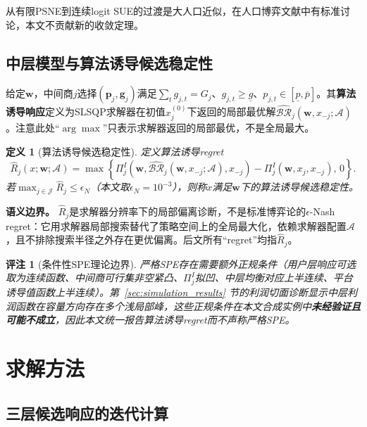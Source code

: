 \documentclass[UTF8,11pt]{ctexart}
\newtheorem{remark}{评注}
\newtheorem{definition}{定义}
\newcommand{\J}{\mathcal{J}}
\newcommand{\w}{\boldsymbol{w}}
\newcommand{\p}{\boldsymbol{p}}
\newcommand{\g}{\boldsymbol{g}}
\begin{document}
从有限PSNE到连续logit SUE的过渡是大人口近似，在人口博弈文献中有标准讨论\cite{sandholm2010population}，本文不贡献新的收敛定理。

\subsection{中层模型与算法诱导候选稳定性}
\label{sec:middle_intermediary}

给定$\w$，中间商$j$选择$(\p_j,\g_j)$满足$\sum_t g_{j,t}=G_j$、$g_{j,t}\ge\underline g$、$p_{j,t}\in[\underline p,\overline p]$。其\textbf{算法诱导响应}定义为SLSQP求解器在初值$x_j^{(0)}$下返回的局部最优解$\widehat{\mathcal{BR}}_j(\w,x_{-j};\mathcal{A})$。注意此处“$\arg\max$”只表示求解器返回的局部最优，不是全局最大。

\begin{definition}[算法诱导候选稳定性]
\label{def:solver_regret_candidate}
定义算法诱导regret
\begin{equation}
  \widehat R_j(x;\w;\mathcal{A})=
  \max\!\left\{
  \Pi^I_j(\w,\widehat{\mathcal{BR}}_j(\w,x_{-j};\mathcal{A}),x_{-j})
  -\Pi^I_j(\w,x_j,x_{-j}),\,0
  \right\}.
  \label{eq:solver_reported_regret}
\end{equation}
若$\max_{j\in\J}\widehat R_j\le\epsilon_N$（本文取$\epsilon_N=10^{-3}$），则称$x$满足$\w$下的算法诱导候选稳定性。
\end{definition}

\textbf{语义边界。} $\widehat R_j$是求解器分辨率下的局部偏离诊断，不是标准博弈论的$\epsilon$-Nash regret：它用求解器局部搜索替代了策略空间上的全局最大化，依赖求解器配置$\mathcal{A}$，且不排除搜索半径之外存在更优偏离。后文所有“regret”均指$\widehat R_j$。

\begin{remark}[条件性SPE理论边界]
严格SPE存在需要额外正规条件（用户层响应可选取为连续函数、中间商可行集非空紧凸、$\Pi^I_j$拟凹、中层均衡对应上半连续、平台诱导值函数上半连续）。第~\ref{sec:simulation_results} 节的利润切面诊断显示中层利润函数在容量方向存在多个浅局部峰，这些正规条件在本文合成实例中\textbf{未经验证且可能不成立}，因此本文统一报告算法诱导regret而不声称严格SPE。
\end{remark}


\section{求解方法}
\label{sec:solution}

\subsection{三层候选响应的迭代计算}
\label{sec:fixed_point}
\end{document}
